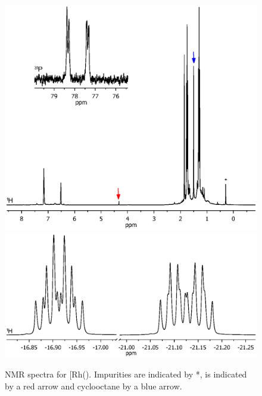 \begin{figure}[htbp]
\begin{center}
\vspace{0.5cm}
\includegraphics[trim = 2.5cm 8.5cm 2.5cm 7.0cm, clip]{../NMR/7006E.eps}
\includegraphics[trim = 2.0cm 2.5cm 2.0cm 17cm, clip]{../NMR/7007.eps}
\caption[NMR spectra for \ce{[Rh(\tButhixantphos)Cl(H)2]}]{NMR spectra for \texorpdfstring{[Rh(\tButhixantphos)\ce{Cl(H)2]}} R.  Impurities are indicated by *,  is indicated by a red arrow and cyclooctane by a blue arrow.}
\vspace{0.2cm}
\label{rhodiumhydridenmr}
\end{center}
\end{figure}
\vspace{0.2cm}

